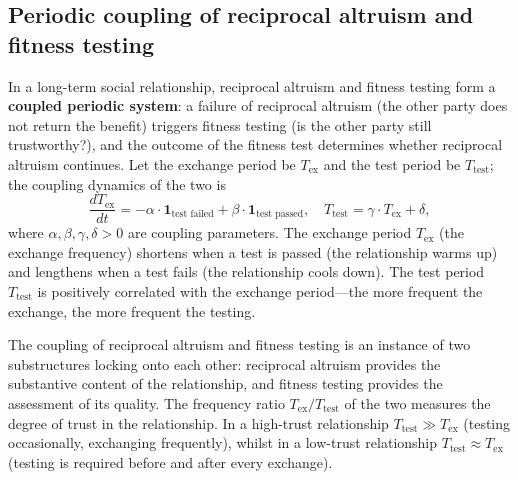 \subsection{Periodic coupling of reciprocal altruism and fitness testing}

\begin{proposition}\label{prop:exchange_test_coupling}
In a long-term social relationship, reciprocal altruism and fitness testing form a \textbf{coupled periodic system}: a failure of reciprocal altruism (the other party does not return the benefit) triggers fitness testing (is the other party still trustworthy?), and the outcome of the fitness test determines whether reciprocal altruism continues. Let the exchange period be $T_{\text{ex}}$ and the test period be $T_{\text{test}}$; the coupling dynamics of the two is
\[
\frac{dT_{\text{ex}}}{dt} = -\alpha \cdot \mathbf{1}_{\text{test failed}} + \beta \cdot \mathbf{1}_{\text{test passed}}, \quad T_{\text{test}} = \gamma \cdot T_{\text{ex}} + \delta,
\]
where $\alpha, \beta, \gamma, \delta > 0$ are coupling parameters. The exchange period $T_{\text{ex}}$ (the exchange frequency) shortens when a test is passed (the relationship warms up) and lengthens when a test fails (the relationship cools down). The test period $T_{\text{test}}$ is positively correlated with the exchange period---the more frequent the exchange, the more frequent the testing.

The coupling of reciprocal altruism and fitness testing is an instance of two substructures locking onto each other: reciprocal altruism provides the substantive content of the relationship, and fitness testing provides the assessment of its quality. The frequency ratio $T_{\text{ex}}/T_{\text{test}}$ of the two measures the degree of trust in the relationship. In a high-trust relationship $T_{\text{test}} \gg T_{\text{ex}}$ (testing occasionally, exchanging frequently), whilst in a low-trust relationship $T_{\text{test}} \approx T_{\text{ex}}$ (testing is required before and after every exchange).
\end{proposition}

